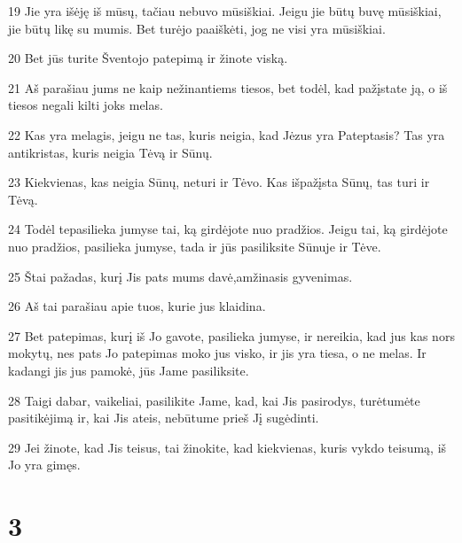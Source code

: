 \par 19 Jie yra išėję iš mūsų, tačiau nebuvo mūsiškiai. Jeigu jie būtų buvę mūsiškiai, jie būtų likę su mumis. Bet turėjo paaiškėti, jog ne visi yra mūsiškiai. 
\par 20 Bet jūs turite Šventojo patepimą ir žinote viską. 
\par 21 Aš parašiau jums ne kaip nežinantiems tiesos, bet todėl, kad pažįstate ją, o iš tiesos negali kilti joks melas. 
\par 22 Kas yra melagis, jeigu ne tas, kuris neigia, kad Jėzus yra Pateptasis? Tas yra antikristas, kuris neigia Tėvą ir Sūnų. 
\par 23 Kiekvienas, kas neigia Sūnų, neturi ir Tėvo. Kas išpažįsta Sūnų, tas turi ir Tėvą. 
\par 24 Todėl tepasilieka jumyse tai, ką girdėjote nuo pradžios. Jeigu tai, ką girdėjote nuo pradžios, pasilieka jumyse, tada ir jūs pasiliksite Sūnuje ir Tėve. 
\par 25 Štai pažadas, kurį Jis pats mums davė,­amžinasis gyvenimas. 
\par 26 Aš tai parašiau apie tuos, kurie jus klaidina. 
\par 27 Bet patepimas, kurį iš Jo gavote, pasilieka jumyse, ir nereikia, kad jus kas nors mokytų, nes pats Jo patepimas moko jus visko, ir jis yra tiesa, o ne melas. Ir kadangi jis jus pamokė, jūs Jame pasiliksite. 
\par 28 Taigi dabar, vaikeliai, pasilikite Jame, kad, kai Jis pasirodys, turėtumėte pasitikėjimą ir, kai Jis ateis, nebūtume prieš Jį sugėdinti. 
\par 29 Jei žinote, kad Jis teisus, tai žinokite, kad kiekvienas, kuris vykdo teisumą, iš Jo yra gimęs.


\chapter{3}


